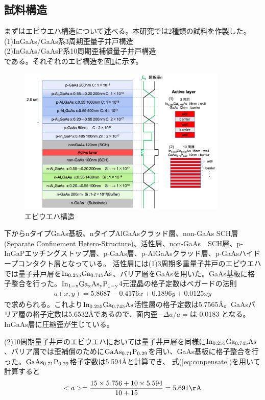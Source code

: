\subsection{試料構造}%
まずはエピウエハ構造について述べる。本研究では2種類の試料を作製した。\\
(1)InGaAs/GaAs系3周期歪量子井戸構造\\
(2)InGaAs/GaAsP系10周期歪補償量子井戸構造\\
である。それぞれのエピ構造を図\ref{fig:fig_2_1_wafer_structure}に示す。
\begin{figure}[hb]
	\centering
	\includegraphics[width=10cm]{figure/fig_2_1_wafer_structure}
	\caption{エピウエハ構造}
	\label{fig:fig_2_1_wafer_structure}
\end{figure}
下からnタイプGaAs基板、nタイプAlGaAsクラッド層、non-GaAs SCH層(Separate Confinement Hetero-Structure)、活性層、non-GaAs　SCH層、p-InGaPエッチングストップ層、p-GaAs層、p-AlGaAsクラッド層、p-GaAsハイドープコンタクト層となっている。
活性層には(1)3周期多重量子井戸のエピウエハでは量子井戸層を$\rm{In_{0.255}Ga_{0.745}As}$、バリア層をGaAsを用いた。GaAs基板に格子整合を行った。$\rm{In_{1-x}Ga_{x}As_{y}P_{1-y}}$4元混晶の格子定数はべガードの法則
\begin{eqnarray}
a(x,y)=5.8687-0.4176x+0.1896y+0.0125xy
\end{eqnarray}
で求められる\cite{ref_iga}。これより$\rm{In_{0.255}Ga_{0.745}As}$活性層の格子定数は5.7565\AA 。GaAsバリア層の格子定数は5.6532\AA であるので、面内歪$-\Delta a/a=$は-0.0183 となる。InGaAs層に圧縮歪が生じている。

(2)10周期量子井戸のエピウエハにおいては量子井戸層を同様に$\rm{In_{0.255}Ga_{0.745}As}$、バリア層では歪補償のために$\rm{GaAs_{0.71}P_{0.29}}$を用い、GaAs基板に格子整合を行った。$\rm{GaAs_{0.71}P_{0.29}}$格子定数は5.594\AA と計算でき、
式(\ref{eq:conpensate})を用いて計算すると
\begin{eqnarray}
<a>=\dfrac{15 \times 5.756+10\times 5.594 }{10+15}=5.691\rm{\AA}
\end{eqnarray}


